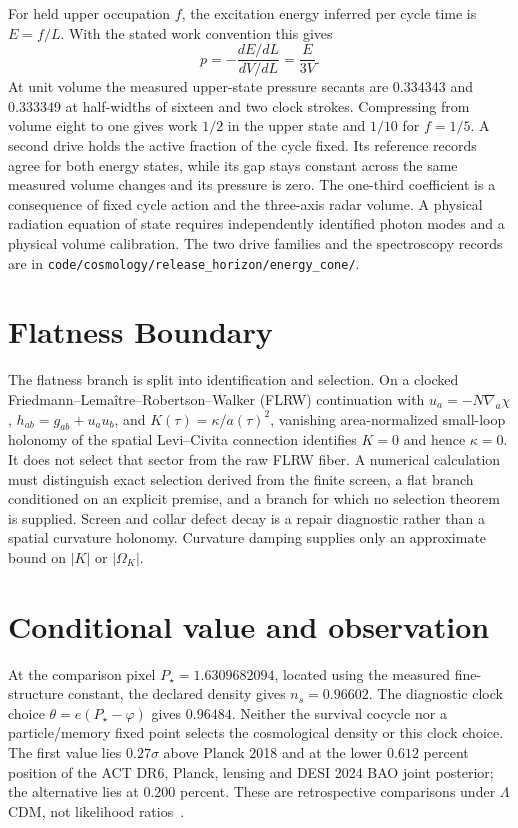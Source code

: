 \documentclass[11pt]{article}
\theoremstyle{remark}
\theoremstyle{plain}
\newcommand{\pathref}[1]{\nolinkurl{#1}}
\begin{document}
For held upper occupation \(f\), the excitation energy inferred per
cycle time is \(E=f/L\). With the stated work convention this gives
\[
 p=-\frac{dE/dL}{dV/dL}=\frac{E}{3V}.
\]
At unit volume the measured upper-state pressure secants are 0.334343
and 0.333349 at half-widths of sixteen and two clock strokes.
Compressing from volume eight to one gives work \(1/2\) in the upper
state and \(1/10\) for \(f=1/5\). A second drive holds the active
fraction of the cycle fixed. Its reference records agree for both
energy states, while its gap stays constant across the same measured
volume changes and its pressure is zero. The one-third coefficient is
a consequence of fixed cycle action and the three-axis radar volume.
A physical radiation equation of state requires independently identified
photon modes and a physical volume calibration. The two drive families
and the spectroscopy records are in
\mbox{\pathref{code/cosmology/release_horizon/energy_cone/}}.

\section{Flatness Boundary}

The flatness branch is split into identification and selection. On a clocked
Friedmann--Lema\^itre--Robertson--Walker (FLRW) continuation
with \(u_a=-N\nabla_a\chi\), \(h_{ab}=g_{ab}+u_au_b\), and
\(K(\tau)=\kappa/a(\tau)^2\), vanishing area-normalized small-loop holonomy of
the spatial Levi--Civita connection identifies \(K=0\) and hence
\(\kappa=0\). It does not select that sector
from the raw FLRW fiber. A numerical calculation must distinguish exact
selection derived from the finite screen, a flat branch conditioned on an
explicit premise, and a branch for which no selection theorem is supplied. Screen and collar defect
decay is a repair diagnostic rather than a spatial curvature holonomy.
Curvature damping supplies only an approximate bound on \(|K|\) or
\(|\Omega_K|\).

\section{Conditional value and observation}
At the comparison pixel \(P_\star=1.6309682094\), located using the
measured fine-structure constant, the declared density gives
\(n_s=0.96602\). The diagnostic clock choice
\(\theta=e(P_\star-\varphi)\) gives \(0.96484\). Neither the survival
cocycle nor a particle/memory fixed point selects the cosmological density
or this clock choice. The first value lies \(0.27\sigma\) above Planck
2018 and at the lower \(0.612\) percent position of the ACT DR6, Planck,
lensing and DESI 2024 BAO joint posterior; the alternative lies at
\(0.200\) percent. These are retrospective comparisons under
\(\Lambda\)CDM, not likelihood ratios~\cite{act2025,ophpublicdata}.
\end{document}
